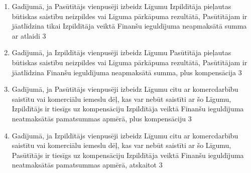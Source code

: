 \begin{multicols}{2}
\begin{enumerate}
\begin{enumerate}
		\item Gadījumā, ja Pasūtītājs vienpusēji izbeidz Līgumu Izpildītāja pieļautas būtiskas saistību neizpildes vai Līguma pārkāpuma rezultātā, Pasūtītājam ir jāatlīdzina tikai Izpildītāja veiktā Finanšu ieguldījuma neapmaksātā summa ar atlaidi 3%
		\item Gadījumā, ja Izpildītājs vienpusēji izbeidz Līgumu Pasūtītāja pieļautas būtiskas saistību neizpildes vai Līguma pārkāpuma rezultātā, Pasūtītājam ir jāatlīdzina Finanšu ieguldījuma neapmaksātā summa, plus kompensācija 3%
		\item Gadījumā, ja Pasūtītājs vienpusēji izbeidz Līgumu citu ar komercdarbību saistītu vai komerciālu iemeslu dēļ, kas var nebūt saistīti ar šo Līgumu, Izpildītājs ir tiesīgs uz kompensāciju Izpildītāja veiktā Finanšu ieguldījuma neatmaksātās pamatsummas apmērā, plus kompensāciju 3%
		\item Gadījumā, ja Izpildītājs vienpusēji izbeidz Līgumu citu ar komercdarbību saistītu vai komerciālu iemeslu dēļ, kas var nebūt saistīti ar šo Līgumu, Pasūtītājs ir tiesīgs uz kompensāciju Izpildītāja veiktā Finanšu ieguldījuma neatmaksātās pamatsummas apmērā, atskaitot 3%

\end{enumerate}
\end{enumerate}
\end{multicols}
